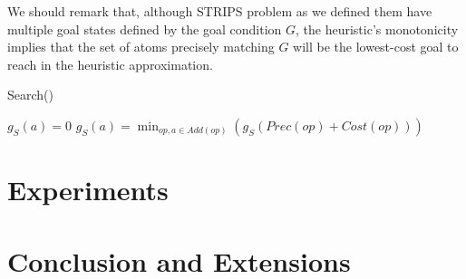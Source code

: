 \documentclass[letterpaper]{article}
\begin{document}
We should remark that, although STRIPS problem as we defined them have multiple goal states defined by the goal condition $G$, the heuristic's monotonicity implies that the set of atoms precisely matching $G$ will be the lowest-cost goal to reach in the heuristic approximation.

\begin{algorithm}
\caption{Search()}
\label{alg:HSP}
\begin{algorithmic}
\REPEAT
{}
\STATE $g_S(a) = 0$
\ELSE
\STATE $g_S(a) = \min_{op,a\in Add(op)} \left(g_S(Prec(op) + Cost(op))\right)$
\ENDIF
\ENDFOR
{}
\end{algorithmic}
\end{algorithm}

\section{Experiments}



\section{Conclusion and Extensions}
\end{document}
